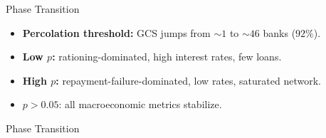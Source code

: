 \begin{frame}[shrink=0.1]{Phase Transition}
  \begin{itemize}
    \item \textbf{Percolation threshold:} GCS jumps from $\sim 1$ to $\sim 46$ banks ($92\%$).
    \item \textbf{Low $p$:} rationing-dominated, high interest rates, few loans.
    \item \textbf{High $p$:} repayment-failure-dominated, low rates, saturated network.
    \item $p > 0.05$: all macroeconomic metrics stabilize.
  \end{itemize}
\end{frame}

\begin{frame}[shrink=0.1]{Phase Transition}

  \vspace{0.05cm}


\end{frame}

